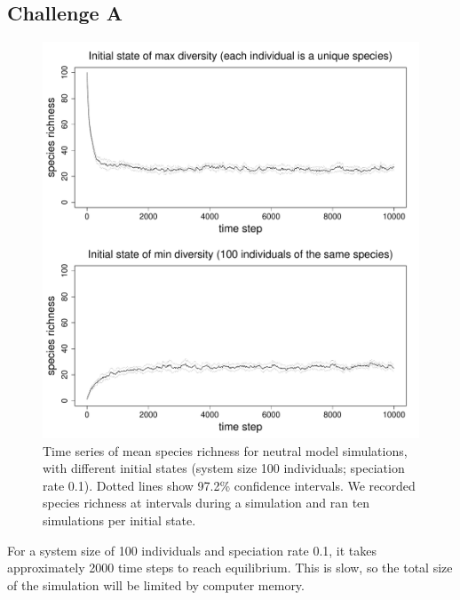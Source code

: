 \documentclass[11pt]{article}
\begin{document}
\subsection*{Challenge A}
\begin{figure}[h]
\centering
\includegraphics[width=0.8\linewidth]{../Results/Challenge_A.pdf}
\caption{Time series of mean species richness for neutral model simulations, with different initial states (system size 100 individuals; speciation rate 0.1). Dotted lines show 97.2\% confidence intervals. We recorded species richness at intervals during a simulation and ran ten simulations per initial state.} %
\end{figure}

For a system size of 100 individuals and speciation rate 0.1, it takes approximately 2000 time steps to reach equilibrium. This is slow, so the total size of the simulation will be limited by computer memory.

\newpage
\end{document}
